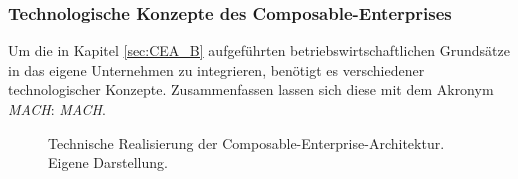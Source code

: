 \subsubsection{Technologische Konzepte des Composable-Enterprises}
Um die in Kapitel \ref{sec:CEA_B} aufgeführten betriebswirtschaftlichen Grundsätze in das eigene Unternehmen zu integrieren, benötigt es verschiedener technologischer Konzepte. Zusammenfassen lassen sich diese mit dem Akronym \textit{MACH}: \textit{\acl{MACH}}.
\begin{center}
	\begin{figure}[H]
		\centering
		\caption[Technische Realisierung der Composable-Enterprise-Architektur]{Technische Realisierung der Composable-Enterprise-Architektur. Eigene Darstellung.}
		\label{fig:CEA_K}
	\end{figure}	
\end{center}
\vspace*{-15mm}
